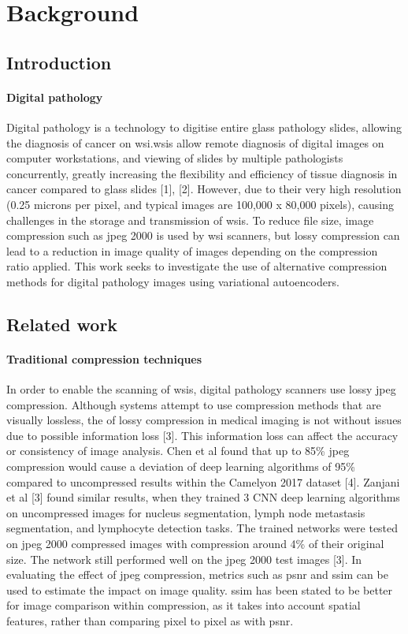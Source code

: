 \documentclass[review]{elsarticle}
\begin{document}
\linenumbers

\section{Background}
\subsection{Introduction}
\paragraph{Digital pathology} Digital pathology is a technology to digitise entire glass pathology slides, allowing the diagnosis of cancer on \gls{wsi}.\glspl{wsi} allow remote diagnosis of digital images on computer workstations, and viewing of slides by multiple pathologists concurrently, greatly increasing the flexibility and efficiency of tissue diagnosis in cancer compared to glass slides [1], [2]. However, due to their very high resolution (0.25 microns per pixel, and typical images are 100,000 x 80,000 pixels), causing challenges in the storage and transmission of \glspl{wsi}. To reduce file size, image compression such as \gls{jpeg} 2000 is used by \gls{wsi} scanners, but lossy compression can lead to a reduction in image quality of images depending on the compression ratio applied. This work seeks to investigate the use of alternative compression methods for digital pathology images using variational autoencoders.

\subsection{Related work}
\paragraph{Traditional compression techniques}
In order to enable the scanning of \glspl{wsi}, digital pathology scanners use lossy \gls{jpeg} compression. Although systems attempt to use compression methods that are visually lossless, the of lossy compression in medical imaging is not without issues due to possible information loss [3]. This information loss can affect the accuracy or consistency of image analysis. Chen et al found that up to 85\% \gls{jpeg} compression would cause a deviation of deep learning algorithms of 95\% compared to uncompressed results within the Camelyon 2017 dataset [4]. Zanjani et al [3] found similar results, when they trained 3 CNN deep learning algorithms on uncompressed images for nucleus segmentation, lymph node metastasis segmentation, and lymphocyte detection tasks. The trained networks were tested on \gls{jpeg} 2000 compressed images with compression around 4\% of their original size. The network still performed well on the \gls{jpeg} 2000 test images [3].
In evaluating the effect of \gls{jpeg} compression, metrics such as \gls{psnr} and \gls{ssim} can be used to estimate the impact on image quality. \gls{ssim} has been stated to be better for image comparison within compression, as it takes into account spatial features, rather than comparing pixel to pixel as with \gls{psnr}.
\end{document}
